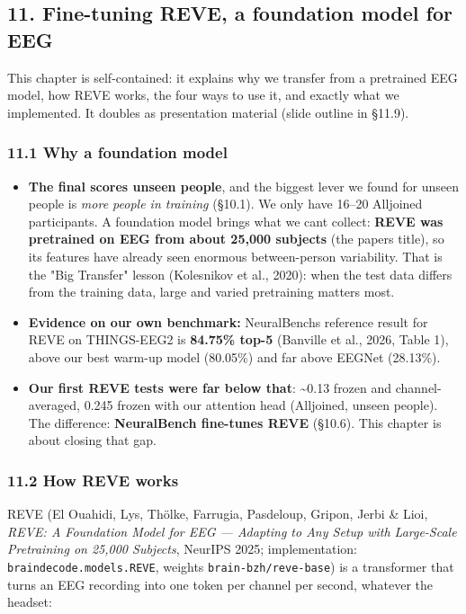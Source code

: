 \documentclass[
  11pt,
]{article}
\providecommand{\tightlist}{%
  \setlength{\itemsep}{0pt}\setlength{\parskip}{0pt}}
\renewcommand{\_}{\oldunderscore\allowbreak}
\begin{document}
\subsection{11. Fine-tuning REVE, a
foundation model for
EEG}\label{fine-tuning-reve-a-foundation-model-for-eeg}

This chapter is self-contained: it
explains why we transfer from a
pretrained EEG model, how REVE works,
the four ways to use it, and exactly
what we implemented. It doubles as
presentation material (slide outline in
§11.9).

\subsubsection{11.1 Why a foundation
model}\label{why-a-foundation-model}

\begin{itemize}
\tightlist
\item
  \textbf{The final scores unseen
  people}, and the biggest lever we
  found for unseen people is \emph{more
  people in training} (§10.1). We only
  have 16--20 Alljoined participants. A
  foundation model brings what we
  can\textquotesingle t collect:
  \textbf{REVE was pretrained on EEG
  from about 25,000 subjects} (the
  paper\textquotesingle s title), so its
  features have already seen enormous
  between-person variability. That is
  the "Big Transfer" lesson (Kolesnikov
  et al., 2020): when the test data
  differs from the training data, large
  and varied pretraining matters most.
\item
  \textbf{Evidence on our own
  benchmark:}
  NeuralBench\textquotesingle s
  reference result for REVE on
  THINGS-EEG2 is \textbf{84.75\% top-5}
  (Banville et al., 2026, Table 1),
  above our best warm-up model (80.05\%)
  and far above EEGNet (28.13\%).
\item
  \textbf{Our first REVE tests were far
  below that}: \textasciitilde0.13
  frozen and channel-averaged, 0.245
  frozen with our attention head
  (Alljoined, unseen people). The
  difference: \textbf{NeuralBench
  fine-tunes REVE} (§10.6). This chapter
  is about closing that gap.
\end{itemize}

\subsubsection{11.2 How REVE
works}\label{how-reve-works}

REVE (El Ouahidi, Lys, Thölke, Farrugia,
Pasdeloup, Gripon, Jerbi \& Lioi,
\emph{REVE: A Foundation Model for EEG
--- Adapting to Any Setup with
Large-Scale Pretraining on 25,000
Subjects}, NeurIPS 2025; implementation:
\texttt{braindecode.models.REVE},
weights \texttt{brain-bzh/reve-base}) is
a transformer that turns an EEG
recording into one token per channel per
second, whatever the headset:
\end{document}

